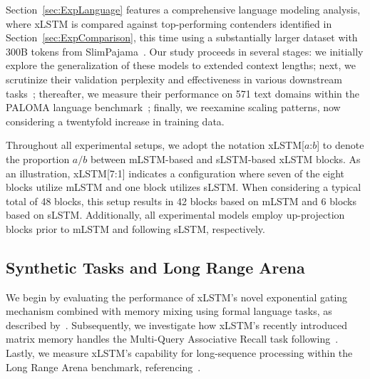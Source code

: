 Section~\ref{sec:ExpLanguage} features a comprehensive language modeling analysis, where xLSTM is compared against top-performing contenders identified in Section~\ref{sec:ExpComparison}, this time using a substantially larger dataset with 300B tokens from SlimPajama~\citep{Soboleva:23}. Our study proceeds in several stages: we initially explore the generalization of these models to extended context lengths; next, we scrutinize their validation perplexity and effectiveness in various downstream tasks~\citep{Sutawika:24}; thereafter, we measure their performance on 571 text domains within the PALOMA language benchmark~\citep{Magnusson:23arxivshort}; finally, we reexamine scaling patterns, now considering a twentyfold increase in training data.

\label{sec:xlstm_blocks_notation}
Throughout all experimental setups, we adopt the notation xLSTM[$a$:$b$] to denote the proportion $a/b$ between mLSTM-based and sLSTM-based xLSTM blocks. As an illustration, xLSTM[7:1] indicates a configuration where seven of the eight blocks utilize mLSTM and one block utilizes sLSTM. When considering a typical total of 48 blocks, this setup results in 42 blocks based on mLSTM and 6 blocks based on sLSTM. Additionally, all experimental models employ up-projection blocks prior to mLSTM and following sLSTM, respectively.

\subsection{Synthetic Tasks and Long Range Arena}
\label{sec:ExpSyntethic}
We begin by evaluating the performance of xLSTM's novel exponential gating mechanism combined with memory mixing using formal language tasks, as described by~\citep{Deletang:23}. Subsequently, we investigate how xLSTM's recently introduced matrix memory handles the Multi-Query Associative Recall task following~\citep{Arora:23arxiv}. Lastly, we measure xLSTM's capability for long-sequence processing within the Long Range Arena benchmark, referencing~\citep{Tay:21}.


